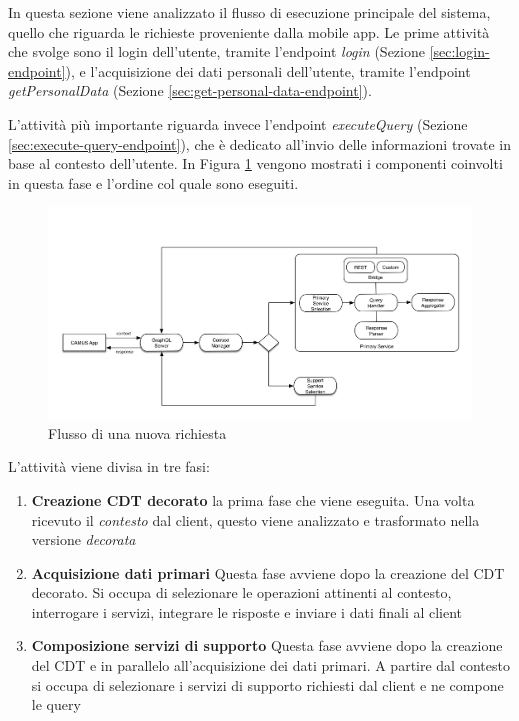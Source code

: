 In questa sezione viene analizzato il flusso di esecuzione principale del sistema, quello che riguarda le richieste proveniente dalla mobile app. Le prime attività che svolge sono il login dell'utente, tramite l'endpoint \emph{login} (Sezione \ref{sec:login-endpoint}), e l'acquisizione dei dati personali dell'utente, tramite l'endpoint \emph{getPersonalData} (Sezione \ref{sec:get-personal-data-endpoint}).

L'attività più importante riguarda invece l'endpoint \emph{executeQuery} (Sezione \ref{sec:execute-query-endpoint}), che è dedicato all'invio delle informazioni trovate in base al contesto dell'utente. In Figura \ref{fig:flusso-nuova-richiesta} vengono mostrati i componenti coinvolti in questa fase e l'ordine col quale sono eseguiti.

\begin{figure}[ht]
	\centering
	\includegraphics[width=\textwidth]{5-implementazione-backend/Immagini/flusso_richiesta.png}
	\caption{Flusso di una nuova richiesta\label{fig:flusso-nuova-richiesta}}
\end{figure}

L'attività viene divisa in tre fasi:

\begin{enumerate}
	\item \textbf{Creazione CDT decorato}
	\upe la prima fase che viene eseguita. Una volta ricevuto il \emph{contesto} dal client, questo viene analizzato e trasformato nella versione \emph{decorata}
	\item \textbf{Acquisizione dati primari}
	Questa fase avviene dopo la creazione del CDT decorato. Si occupa di selezionare le operazioni attinenti al contesto, interrogare i servizi, integrare le risposte e inviare i dati finali al client
	\item \textbf{Composizione servizi di supporto}
	Questa fase avviene dopo la creazione del CDT e in parallelo all'acquisizione dei dati primari. A partire dal contesto si occupa di selezionare i servizi di supporto richiesti dal client e ne compone le query
\end{enumerate}

